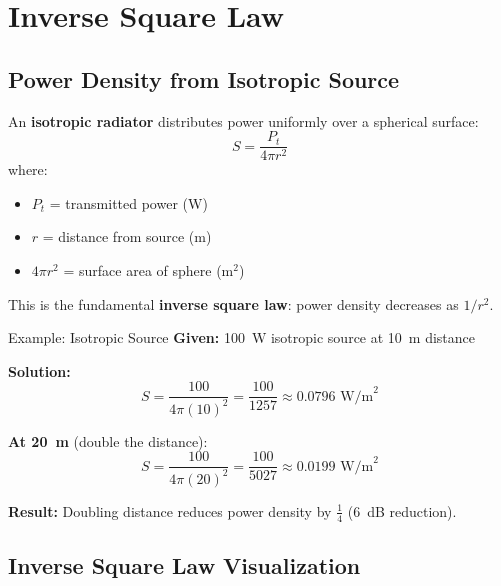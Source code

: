 \section{Inverse Square Law}

\subsection{Power Density from Isotropic Source}

An \textbf{isotropic radiator} distributes power uniformly over a spherical surface:
\begin{equation}
S = \frac{P_t}{4\pi r^2}
\label{eq:inverse-square-law}
\end{equation}
where:
\begin{itemize}
\item $P_t$ = transmitted power (W)
\item $r$ = distance from source (m)
\item $4\pi r^2$ = surface area of sphere (m$^2$)
\end{itemize}

This is the fundamental \textbf{inverse square law}: power density decreases as $1/r^2$.

\begin{calloutbox}{Example: Isotropic Source}
\textbf{Given:} 100~W isotropic source at 10~m distance

\textbf{Solution:}
\[
S = \frac{100}{4\pi (10)^2} = \frac{100}{1257} \approx 0.0796 \text{~W/m}^2
\]

\textbf{At 20~m} (double the distance):
\[
S = \frac{100}{4\pi (20)^2} = \frac{100}{5027} \approx 0.0199 \text{~W/m}^2
\]

\textbf{Result:} Doubling distance reduces power density by $\frac{1}{4}$ (6~dB reduction).
\end{calloutbox}

\subsection{Inverse Square Law Visualization}

